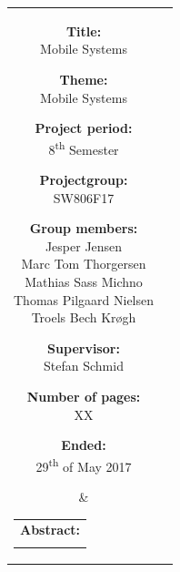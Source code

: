 \begin{titlepage}
\begin{nopagebreak}
{            \noindent
            \begin{tabular}{cc}
                \parbox[t]{.40\textwidth}{
                    \begin{description}
                        \item {\bf Title:}\\
                        Mobile Systems
                        \item {\bf Theme:}\\
                        Mobile Systems
                        \item {\bf Project period:}\\
                            8\textsuperscript{th} Semester
                            \hspace{4cm}
                        \item {\bf Projectgroup:}\\
                            SW806F17
                            \hspace{4cm}
                        \item {\bf Group members:}\\
                        Jesper Jensen \\
                        Marc Tom Thorgersen \\
                        Mathias Sass Michno \\
                        Thomas Pilgaard Nielsen \\
                        Troels Bech Krøgh
                        \item {\bf Supervisor:}\\
                            Stefan Schmid
                        \item {\bf Number of pages:}\\
                            XX
                        \item {\bf Ended:}\\
                            29\textsuperscript{th} of May 2017
                    \end{description}
                } &
                \parbox[t]{.45\textwidth}{
                    \begin{tabular}[t]{l}
                        {\bf Abstract:}\bigskip \\
                        \fbox{
                            \parbox{.45\textwidth}{\smallskip
                                {\vfill{\small
                                        
                                \smallskip}}
                            }
                        }
                    \end{tabular}
                }
            \end{tabular}
        }
    \end{nopagebreak}
\end{titlepage}
